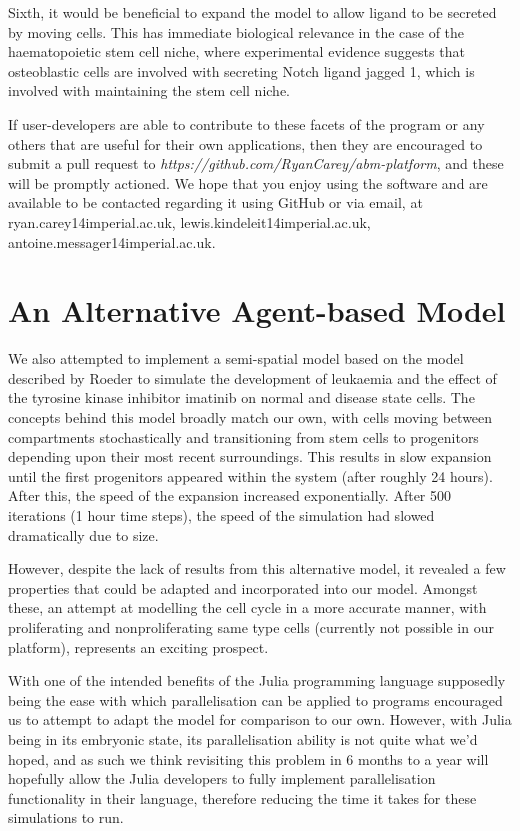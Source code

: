 \documentclass[12pt]{article}
\begin{document}
Sixth, it would be beneficial to expand the model to allow ligand to be 
secreted by moving cells. This has immediate biological relevance in the 
case of the haematopoietic stem cell niche, where experimental evidence 
suggests that osteoblastic cells are involved with secreting Notch 
ligand jagged 1, which is involved with maintaining the stem cell niche.
\cite{roeder06}

If user-developers are able to contribute to these facets of the program 
or any others that are useful for their own applications, then they are 
encouraged to submit a pull request to {\itshape 
https://github.com/RyanCarey/abm-platform}, and these will be
promptly actioned. We hope that you enjoy using the software 
and are available to be contacted regarding it using GitHub or via 
email, at ryan.carey14i\makeatletter mperial.ac.uk, 
lewis.kindeleit14\makeatletter imperial.ac.uk, 
antoine.messager14\makeatletter imperial.ac.uk.

\section{An Alternative Agent-based Model}
We also attempted to implement a semi-spatial model based on the model 
described by Roeder to simulate the development of leukaemia and the 
effect of the tyrosine kinase inhibitor imatinib on normal and disease 
state cells. The concepts behind this model broadly match our own, with 
cells moving between compartments stochastically and transitioning from 
stem cells to progenitors depending upon their most recent surroundings. 
This results in slow expansion until the first progenitors appeared 
within the system (after roughly 24 hours). After this, the speed of the 
expansion increased exponentially. After 500 iterations (1 hour time 
steps), the speed of the simulation had slowed dramatically due to size.

However, despite the lack of results from this alternative model, it 
revealed a few properties that could be adapted and incorporated into 
our model. Amongst these, an attempt at modelling the cell cycle in a 
more accurate manner, with proliferating and nonproliferating same type 
cells (currently not possible in our platform), represents an exciting 
prospect.

With one of the intended benefits of the Julia programming language 
supposedly being the ease with which parallelisation can be applied to 
programs encouraged us to attempt to adapt the model for comparison to 
our own. However, with Julia being in its embryonic state, its 
parallelisation ability is not quite what we'd hoped, and as such we 
think revisiting this problem in 6 months to a year will hopefully allow 
the Julia developers to fully implement parallelisation functionality in 
their language, therefore reducing the time it takes for these 
simulations to run.
\end{document}
